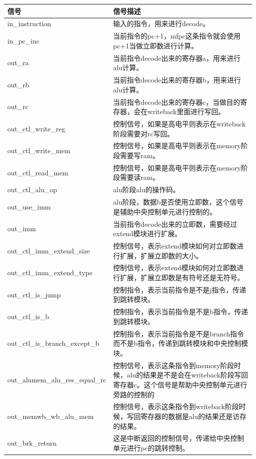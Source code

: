 \begin{center}
    \label{table:decode}
    \begin{longtable}{p{}p{}}
        \toprule
        信号 & 信号描述 \\
        \midrule
            in\_instruction & 输入的指令，用来进行decode。\\
            in\_pc\_inc & 当前指令的pc+1，mfpc这条指令就会使用pc+1当做立即数进行计算。\\
            out\_ra & 当前指令decode出来的寄存器a，用来进行alu计算。\\
            out\_rb & 当前指令decode出来的寄存器b，用来进行alu计算。\\
            out\_rc & 当前指令decode出来的寄存器c，当做目的寄存器，会在writeback里面进行写回。\\
            out\_ctl\_write\_reg & 控制信号，如果是高电平则表示在writeback阶段需要对rc写回。\\
            out\_ctl\_write\_mem & 控制信号，如果是高电平则表示在memory阶段需要写ram。\\
            out\_ctl\_read\_mem & 控制信号，如果是高电平则表示在memory阶段需要读ram。\\
            out\_ctl\_alu\_op & alu阶段alu的操作码。\\
            out\_use\_imm & alu阶段，数据b是否使用立即数，这个信号是辅助中央控制单元进行控制的。\\
            out\_imm & 当前指令decode出来的立即数，需要经过extend模块进行扩展。\\
            out\_ctl\_imm\_extend\_size & 控制信号，表示extend模块如何对立即数进行扩展，扩展立即数的大小。\\
            out\_ctl\_imm\_extend\_type & 控制信号，表示extend模块如何对立即数进行扩展，扩展立即数是有符号还是无符号。\\
            out\_ctl\_is\_jump & 控制指令，表示当前指令是不是j指令，传递到跳转模块。\\
            out\_ctl\_is\_b & 控制指令，表示当前指令是不是b指令，传递到跳转模块。\\
            out\_ctl\_is\_branch\_except\_b & 控制指令，表示当前指令是不是branch指令而不是b指令，传递到跳转模块和中央控制模块。\\
            out\_alumem\_alu\_res\_equal\_rc & 控制信号，表示这条指令到memory阶段时候，alu的结果是不是会在writeback阶段写回寄存器c。这个信号是帮助中央控制单元进行旁路的控制的\\
            out\_memwb\_wb\_alu\_mem & 控制信号，表示这条指令到writeback阶段时候，写回寄存器的数据是alu的结果还是访存的结果。\\
            out\_brk\_return & 这是中断返回的控制信号，传递给中央控制单元进行pc的跳转控制。\\
        \bottomrule
    \end{longtable}
\end{center}

